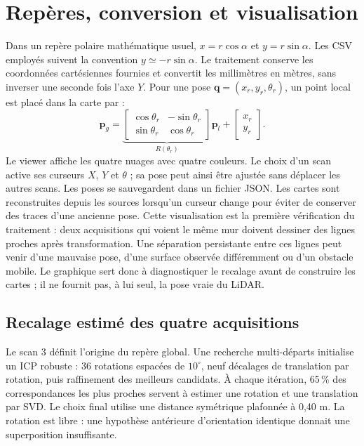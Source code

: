 \documentclass[11pt,a4paper]{article}
\begin{document}
\section{Repères, conversion et visualisation}
Dans un repère polaire mathématique usuel, $x=r\cos\alpha$ et $y=r\sin\alpha$. Les CSV employés suivent la convention $y\simeq-r\sin\alpha$. Le traitement conserve les coordonnées cartésiennes fournies et convertit les millimètres en mètres, sans inverser une seconde fois l'axe $Y$.
Pour une pose $\mathbf{q}=(x_r,y_r,\theta_r)$, un point local est placé dans la carte par :
\[
 \mathbf p_g=\underbrace{\begin{bmatrix}\cos\theta_r&-\sin\theta_r\\\sin\theta_r&\cos\theta_r\end{bmatrix}}_{R(\theta_r)}\mathbf p_l+\begin{bmatrix}x_r\\y_r\end{bmatrix}.
\]
Le viewer affiche les quatre nuages avec quatre couleurs. Le choix d'un scan active ses curseurs $X$, $Y$ et $\theta$ ; sa pose peut ainsi être ajustée sans déplacer les autres scans. Les poses se sauvegardent dans un fichier JSON. Les cartes sont reconstruites depuis les sources lorsqu'un curseur change pour éviter de conserver des traces d'une ancienne pose.
Cette visualisation est la première vérification du traitement : deux acquisitions qui voient le même mur doivent dessiner des lignes proches après transformation. Une séparation persistante entre ces lignes peut venir d'une mauvaise pose, d'une surface observée différemment ou d'un obstacle mobile. Le graphique sert donc à diagnostiquer le recalage avant de construire les cartes ; il ne fournit pas, à lui seul, la pose vraie du LiDAR.

\subsection{Recalage estimé des quatre acquisitions}
Le scan 3 définit l'origine du repère global. Une recherche multi-départs initialise un ICP robuste : 36 rotations espacées de $10^\circ$, neuf décalages de translation par rotation, puis raffinement des meilleurs candidats. À chaque itération, 65\,\% des correspondances les plus proches servent à estimer une rotation et une translation par SVD. Le choix final utilise une distance symétrique plafonnée à 0,40 m.
La rotation est libre : une hypothèse antérieure d'orientation identique donnait une superposition insuffisante.
\end{document}
